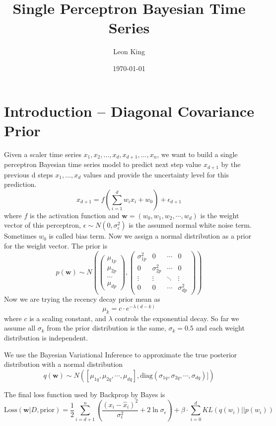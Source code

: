 \documentclass{article}
\title{Single Perceptron Bayesian Time Series}
\author{Leon King}
\date{\today} %
\begin{document}
\maketitle

\section{Introduction – Diagonal Covariance Prior}

Given a scaler time series $x_1, x_2, \dots, x_d, x_{d+1}, \dots, x_n$, we want to build a single perceptron Bayesian time series model to predict next step value $x_{d+1}$ by the previous d steps $x_1, \dots, x_d$ values and provide the uncertainty level for this prediction. $$x_{d+1} = f\left(\sum_{i=1}^dw_i x_i + w_0\right) + \epsilon_{d+1}$$ where $f$ is the activation function and $\mathbf{w}=(w_0,w_1,w_2,\cdots, w_d)$ is the weight vector of this perceptron, $\epsilon \sim N(0, \sigma^2_\epsilon)$ is the assumed normal white noise term. Sometimes $w_0$ is called bias term. Now we assign a normal distribution as a prior for the weight vector. The prior is 
$$ p(\mathbf{w})\sim N\left(\begin{pmatrix}
    \mu_{1p} \\ \mu_{2p} \\ \cdots \\ \mu_{dp}
\end{pmatrix}, 
\begin{pmatrix}
\sigma_{1p}^2 & 0 & \cdots & 0 \\
0 & \sigma_{2p}^2 & \cdots & 0 \\
\vdots & \vdots & \ddots & \vdots \\
0 & 0 & \cdots & \sigma_{dp}^2
\end{pmatrix}
\right) $$
Now we are trying the recency decay prior mean as $$\mu_k = c\cdot e^{-\lambda(d-k)}$$ where $c$ is a scaling constant, and $\lambda$ controls the exponential decay. So far we assume all $\sigma_k$ from the prior distribution is the same, $\sigma_k = 0.5$ and each weight distribution is independent.

We use the Bayesian Variational Inference to approximate the true posterior distribution with a normal distribution $$q(\mathbf{w})\sim N\left([\mu_{1q},\mu_{2q},\cdots,\mu_{dq}], \text{diag}(\sigma_{1q}, \sigma_{2q}, \cdots,\sigma_{dq})]\right)$$

The final loss function used by Backprop by Bayes is $$\text{Loss}(\textbf{w}|D, \text{prior})=\frac{1}{2} \sum_{i=d+1}^n\left(\frac{\left(x_i-\hat{x}_i\right)^2}{\sigma_{\epsilon}^2}+2 \ln \sigma_{\epsilon}\right) + \beta \cdot \sum_{i=0}^dKL\left(q(w_i)||p(w_i)\right)$$
\end{document}
